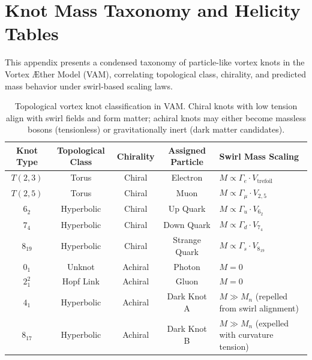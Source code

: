 \documentclass[preprint]{revtex4-2}
\begin{document}
        \section{Knot Mass Taxonomy and Helicity Tables}
        \label{sec:knot_mass_taxonomy}
            This appendix presents a condensed taxonomy of particle-like vortex knots in the Vortex \AE{}ther Model (VAM), correlating topological class, chirality, and predicted mass behavior under swirl-based scaling laws.
        
            \begin{table}[H]
                \centering
                \footnotesize
                \begin{tabular}{|c|c|c|c|l|}
                    \hline
                    \textbf{Knot Type} & \textbf{Topological Class} & \textbf{Chirality} & \textbf{Assigned Particle} & \textbf{Swirl Mass Scaling} \\
                    \hline
                    $T(2,3)$           & Torus            & Chiral   & Electron        & $M \propto \Gamma_{e} \cdot V_{\text{trefoil}}$ \\
                    $T(2,5)$           & Torus            & Chiral   & Muon            & $M \propto \Gamma_{\mu} \cdot V_{2,5}$ \\
                    $6_2$              & Hyperbolic       & Chiral   & Up Quark        & $M \propto \Gamma_{u} \cdot V_{6_2}$ \\
                    $7_4$              & Hyperbolic       & Chiral   & Down Quark      & $M \propto \Gamma_{d} \cdot V_{7_4}$ \\
                    $8_{19}$           & Hyperbolic       & Chiral   & Strange Quark   & $M \propto \Gamma_{s} \cdot V_{8_{19}}$ \\
                    $0_1$              & Unknot           & Achiral  & Photon          & $M = 0$ \\
                    $2_1^2$            & Hopf Link        & Achiral  & Gluon           & $M = 0$ \\
                    $4_1$              & Hyperbolic       & Achiral  & Dark Knot A     & $M \gg M_n$ (repelled from swirl alignment) \\
                    $8_{17}$           & Hyperbolic       & Achiral  & Dark Knot B     & $M \gg M_n$ (expelled with curvature tension) \\
                    \hline
                \end{tabular}
                \caption{Topological vortex knot classification in VAM. Chiral knots with low tension align with swirl fields and form matter; achiral knots may either become massless bosons (tensionless) or gravitationally inert (dark matter candidates).}
                \label{tab:knot_taxonomy}
            \end{table}
\end{document}
